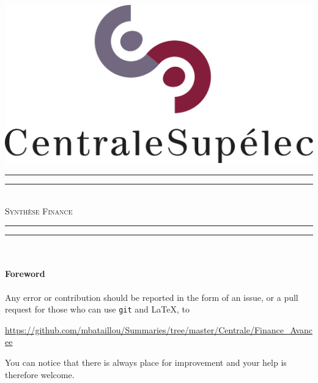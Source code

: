 \begin{titlepage}
\begin{center}


\includegraphics[scale=0.5]{./img/logo_centralesup.jpg} \\[1.5cm]



\vfill
\rule{\textwidth}{1.6pt}\vspace*{-\baselineskip}\vspace*{2pt} %
\rule{\textwidth}{0.4pt}\\[\baselineskip] %
{ \huge  \textsc{Synthèse Finance} \\[0.4cm] }
\rule{\textwidth}{0.4pt}\vspace*{-\baselineskip}\vspace{3.2pt} %
\rule{\textwidth}{1.6pt}\\[1.5cm] %

\vfill
\paragraph{Foreword}
Any error or contribution should be reported
in the form of an issue, or a pull request for those
who can use \texttt{git} and \LaTeX, to
\begin{center}
  \url{https://github.com/mbataillou/Summaries/tree/master/Centrale/Finance_Avancee}
\end{center}
You can notice that there is always place for improvement
and your help is therefore welcome.
\vspace{\baselineskip}


\end{center}
\end{titlepage}
